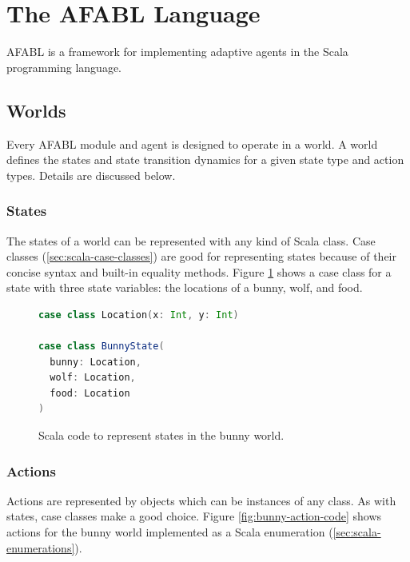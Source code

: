 \section{The AFABL Language}

AFABL is a framework for implementing adaptive agents in the Scala programming language.

\subsection{Worlds}

Every AFABL module and agent is designed to operate in a world. A world defines the states and state transition dynamics for a given state type and action types. Details are discussed below.

\subsubsection{States}

The states of a world can be represented with any kind of Scala class. Case classes (\ref{sec:scala-case-classes}) are good for representing states because of their concise syntax and built-in equality methods. Figure \ref{fig:bunny-state-code} shows a case class for a state with three state variables: the locations of a bunny, wolf, and food.

\begin{figure}[ht]
\begin{center}

\begin{lstlisting}[language=Scala]
case class Location(x: Int, y: Int)

case class BunnyState(
  bunny: Location,
  wolf: Location,
  food: Location
)
\end{lstlisting}

\caption{Scala code to represent states in the bunny world.}
\end{center}
\label{fig:bunny-state-code}
\end{figure}

\subsubsection{Actions}

Actions are represented by objects which can be instances of any class. As with states, case classes make a good choice. Figure \ref{fig:bunny-action-code} shows actions for the bunny world implemented as a Scala enumeration (\ref{sec:scala-enumerations}).

